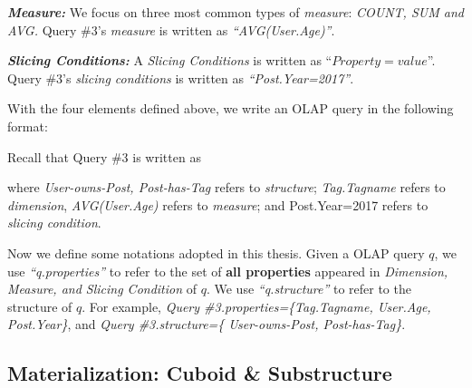 \noindent\textbf{\textit{Measure:}} We focus on three most common types of \textit{measure}: \textit{COUNT, SUM and AVG. } Query \#3's \textit{measure} is written as \textit{``AVG(User.Age)''}.


\noindent\textbf{\textit{Slicing Conditions:}} A \textit{Slicing Conditions} is written as ``$Property = value$''. Query \#3's \textit{slicing conditions} is written as \textit{``Post.Year=2017''}.

\noindent With the four elements defined above, we write an OLAP query in the following format:


\noindent Recall that Query \#3 is written as 


\noindent where \textit{User-owns-Post, Post-has-Tag} refers to  \textit{structure}; \textit{Tag.Tagname} refers to \textit{dimension},\textit{ AVG(User.Age) } refers to \textit{measure}; and {Post.Year=2017} refers to \textit{slicing condition}. 



\par
Now we define some notations adopted in this thesis. Given a OLAP query $q$, we use \textit{``q.properties''} to refer to the set of \textbf{all properties} appeared in \textit{Dimension, Measure, and Slicing Condition} of $q$. We use \textit{``q.structure''} to refer to the structure of $q$. For example, \textit{Query \#3.properties=\{Tag.Tagname, User.Age, Post.Year\}}, and \textit{Query \#3.structure=\{ User-owns-Post, Post-has-Tag\}}.



\subsection{Materialization: Cuboid \& Substructure}
\label{Materialization: Cuboid vs Substructures}



